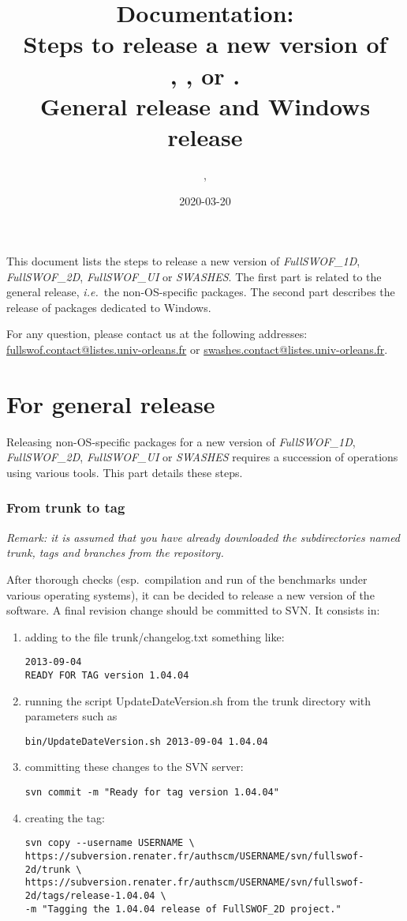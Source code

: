 \documentclass[a4paper, 11pt]{article}
\title{Documentation:\\
Steps to release a new version of\\
\FullSWOFoneD, \FullSWOFtwoD{}, \FullSWOFUI{} or \SWASHES{}.\\
General release and Windows release}
\author{\contactFullName, \contactEmail}
\date{2020-03-20}
\makeatletter
\newcommand{\FullSWOFoneD}{\emph{FullSWOF\_1D}}
\newcommand{\FullSWOFtwoD}{\emph{FullSWOF\_2D}}
\newcommand{\FullSWOFUI}{\emph{FullSWOF\_UI}}
\newcommand{\SWASHES}{\emph{SWASHES}}
\newcommand{\contactFS}{\href{mailto:fullswof.contact@listes.univ-orleans.fr}{fullswof.contact@listes.univ-orleans.fr}}
\newcommand{\contactSWASHES}{\href{mailto:swashes.contact@listes.univ-orleans.fr}{swashes.contact@listes.univ-orleans.fr}}
\makeatother
\begin{document}
\maketitle

\thispagestyle{fancy}

This document lists the steps to release a new version of \FullSWOFoneD, \FullSWOFtwoD{}, \FullSWOFUI{} or \SWASHES{}. The first part is related to the general release, \emph{i.e.}~the non-OS-specific packages. The second part describes the release of packages dedicated to Windows.

For any question, please contact us at the following addresses: \contactFS{} or \contactSWASHES{}.

\part{For general release}

Releasing non-OS-specific packages for a new version of \FullSWOFoneD, \FullSWOFtwoD{}, \FullSWOFUI{} or \SWASHES{} requires a succession of operations using various tools. 
This part details these steps.


\section{From trunk to tag}

\emph{Remark: it is assumed that you have already downloaded the subdirectories named trunk, tags and branches from the repository.}

After thorough checks (esp.\ compilation and run of the benchmarks under various operating systems), it can be decided to release a new version of the software. A final revision change should be committed to SVN\@. It consists in: 
\begin{enumerate}
\item adding to the file trunk/changelog.txt something like:
\begin{verbatim}
2013-09-04
READY FOR TAG version 1.04.04
\end{verbatim}
\item running the script UpdateDateVersion.sh  from the trunk directory with parameters such as
\begin{verbatim}
bin/UpdateDateVersion.sh 2013-09-04 1.04.04
\end{verbatim}
\item committing these changes to the SVN server:
\begin{verbatim}
svn commit -m "Ready for tag version 1.04.04"
\end{verbatim}
\item creating the tag:
\begin{verbatim}
svn copy --username USERNAME \
https://subversion.renater.fr/authscm/USERNAME/svn/fullswof-2d/trunk \
https://subversion.renater.fr/authscm/USERNAME/svn/fullswof-2d/tags/release-1.04.04 \
-m "Tagging the 1.04.04 release of FullSWOF_2D project."
\end{verbatim}
\end{enumerate}
\end{document}
